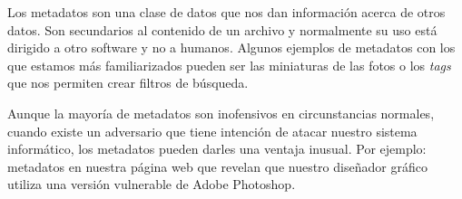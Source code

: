Los metadatos son una clase de datos que nos dan información acerca de otros datos. Son secundarios al contenido de un archivo y normalmente su uso está dirigido a otro software y no a humanos. Algunos ejemplos de metadatos con los que estamos más familiarizados pueden ser las miniaturas de las fotos o los \textit{tags} que nos permiten crear filtros de b\'usqueda.

Aunque la mayoría de metadatos son inofensivos en circunstancias normales, cuando existe un adversario que tiene intención de atacar nuestro sistema informático, los metadatos pueden darles una ventaja inusual. Por ejemplo: metadatos en nuestra página web que revelan que nuestro diseñador gráfico utiliza una versión vulnerable de Adobe Photoshop.